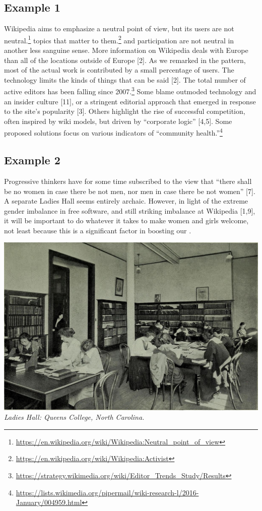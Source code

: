 \hypertarget{example-1}{%
\subsection{Example 1}\label{example-1}}

Wikipedia aims to emphasize a neutral point of view, but its users are
not neutral.\footnote{\url{https://en.wikipedia.org/wiki/Wikipedia:Neutral_point_of_view}}
topics that matter to them.\footnote{\url{https://en.wikipedia.org/wiki/Wikipedia:Activist}}
and participation are not neutral in another less sanguine sense. More
information on Wikipedia deals with Europe than all of the locations
outside of Europe {{[}2{]}}. As we remarked in the pattern, most of the
actual work is contributed by a small percentage of users. The
technology limits the kinds of things that can be said {{[}2{]}}. The
total number of active editors has been falling since 2007.\footnote{\url{https://strategy.wikimedia.org/wiki/Editor_Trends_Study/Results}}
Some blame outmoded technology and an insider culture {{[}11{]}}, or a
stringent editorial approach that emerged in response to the site's
popularity {{[}3{]}}. Others highlight the rise of successful
competition, often inspired by wiki models, but driven by ``corporate
logic'' {{[}4,5{]}}. Some proposed solutions focus on various indicators
of ``community health.''\footnote{\url{https://lists.wikimedia.org/pipermail/wiki-research-l/2016-January/004959.html}}

\hypertarget{example-2}{%
\subsection{Example 2}\label{example-2}}

Progressive thinkers have for some time subscribed to the view that
``there shall be no women in case there be not men, nor men in case
there be not women'' {{[}7{]}}. A separate Ladies Hall seems entirely
archaic. However, in light of the extreme gender imbalance in free
software, and still striking imbalance at Wikipedia {{[}1,9{]}}, it will
be important to do whatever it takes to make women and girls welcome,
not least because this is a significant factor in boosting our .

\includegraphics{images/ladies-hall.jpg}\\
\emph{Ladies Hall: Queens College, North Carolina.}

